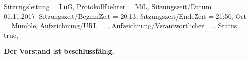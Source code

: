 \begin{Protokoll}{
        Sitzungsleitung                 = {LuG},             %
        Protokollfuehrer                = {MiL},              %
        Sitzungszeit/Datum              = {01.11.2017},       %
        Sitzungszeit/BeginnZeit         = {20:13},            %
        Sitzungszeit/EndeZeit           = {21:56},            %
        Ort                             = {Mumble},            %
        Aufzeichnung/URL                = {},                %
        Aufzeichnung/Verantwortlicher   = {},                  %
        Status                          = {true},            %
    }
    
    \begin{Anwesenheitsliste}
    \end{Anwesenheitsliste}
    
    \textbf{Der Vorstand ist beschlussfähig.}
    
    

\end{Protokoll}

